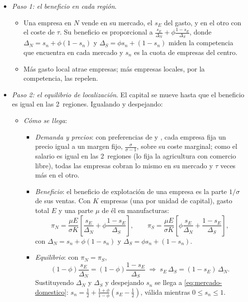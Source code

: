 \documentclass[11pt]{article}
\begin{document}
\begin{itemize}
\item \emph{Paso 1: el beneficio en cada región}.
  \begin{itemize}
  \item Una empresa en $N$ vende en su mercado, el $s_E$ del gasto, y en el otro con el coste de $\tau$. Su beneficio es proporcional a $\frac{s_E}{\Delta_N}+\phi\frac{1-s_E}{\Delta_S}$, donde $\Delta_N=s_n+\phi(1-s_n)$ y $\Delta_S=\phi s_n+(1-s_n)$ miden la competencia que encuentra en cada mercado y $s_n$ es la cuota de empresas del centro.
  \item Más gasto local atrae empresas; más empresas locales, por la competencia, las repelen.
  \end{itemize}
\item \emph{Paso 2: el equilibrio de localización}. El capital se mueve hasta que el beneficio es igual en las 2~regiones. Igualando y despejando:
  \begin{itemize}
  \item \emph{Cómo se llega}:
    \begin{itemize}
    \item \emph{Demanda y precios}: con preferencias de  y , cada empresa fija un precio igual a un margen fijo, $\frac{\sigma}{\sigma-1}$, sobre su coste marginal; como el salario es igual en las 2~regiones (lo fija la agricultura con comercio libre), todas las empresas cobran lo mismo en su mercado y $\tau$ veces más en el otro\nocite{BaldwinEtAl2003Economic}.
    \item \emph{Beneficio}: el beneficio de explotación de una empresa es la parte $1/\sigma$ de sus ventas. Con $K$ empresas (una por unidad de capital), gasto total $E$ y una parte $\mu$ de él en manufacturas:
      \[
      \pi_N=\frac{\mu E}{\sigma K}\left[\frac{s_E}{\Delta_N}+\phi\frac{1-s_E}{\Delta_S}\right],\qquad
      \pi_S=\frac{\mu E}{\sigma K}\left[\phi\frac{s_E}{\Delta_N}+\frac{1-s_E}{\Delta_S}\right],
      \]
      con $\Delta_N=s_n+\phi(1-s_n)$ y $\Delta_S=\phi s_n+(1-s_n)$.
    \item \emph{Equilibrio}: con $\pi_N=\pi_S$,
      \[
      (1-\phi)\frac{s_E}{\Delta_N}=(1-\phi)\frac{1-s_E}{\Delta_S}\;\Longrightarrow\; s_E\,\Delta_S=(1-s_E)\,\Delta_N .
      \]
      Sustituyendo $\Delta_N$ y $\Delta_S$ y despejando $s_n$ se llega a \eqref{eq:mercado-domestico}: $s_n=\frac12+\frac{1+\phi}{1-\phi}\left(s_E-\frac12\right)$, válida mientras $0\le s_n\le1$.\findemo

\end{itemize}
\end{itemize}
\end{itemize}
\end{document}
